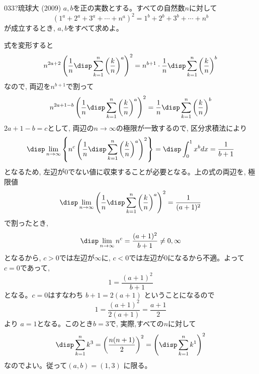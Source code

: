 \begin{prob}{033}{\hosi ?}{琉球大 (2009)}
 $a,b$を正の実数とする。すべての自然数$n$に対して
\[(1^a+2^a+3^a+\cdots +n^a)^2=1^b+2^b+3^b+\cdots +n^b\]
が成立するとき, $a,b$をすべて求めよ。
\end{prob}
式を変形すると
\[n^{2a+2}\left(\dfrac{1}{n}\disp\sum_{k=1}^{n}\left(\dfrac{k}{n}\right)^a\right)^2=n^{b+1}\cdot\dfrac{1}{n}\disp\sum_{k=1}^n\left(\dfrac{k}{n}\right)^b\]
なので, 両辺を$n^{b+1}$で割って
\[ n^{2a+1-b}\left(\dfrac{1}{n}\disp\sum_{k=1}^{n}\left(\dfrac{k}{n}\right)^a\right)^2=\dfrac{1}{n}\disp\sum_{k=1}^n\left(\dfrac{k}{n}\right)^b\]
$2a+1-b=c$として, 両辺の$n\to \infty$の極限が一致するので, 区分求積法により
\[\disp\lim_{n\to \infty} \left\{n^c\left(\dfrac{1}{n}\disp\sum_{k=1}^{n}\left(\dfrac{k}{n}\right)^a\right)^2\right\}=\disp\int_0^1 x^b dx = \dfrac{1}{b+1}\]
となるため, 左辺が0でない値に収束することが必要となる。上の式の両辺を, 極限値
\[\disp\lim_{n\to \infty} \left(\dfrac{1}{n}\disp\sum_{k=1}^n\left(\dfrac{k}{n}\right)^a\right)^{2} = \dfrac{1}{(a+1)^2}\]
で割ったとき,
\[\disp\lim_{n\to \infty} n^c = \dfrac{(a+1)^2}{b+1}\neq 0, \infty\]
となるから, $c>0$では左辺が$\infty$に, $c<0$では左辺が$0$になるから不適。よって$c=0$であって,
\[1=\dfrac{(a+1)^2}{b+1}\]
となる。$c=0$はすなわち $b+1=2(a+1)$ ということになるので
\[1=\dfrac{(a+1)^2}{2(a+1)}=\dfrac{a+1}{2}\]
より $a=1$となる。このとき$b=3$で, 実際,すべての$n$に対して
\[\disp\sum_{k=1}^n k^3=\left(\dfrac{n(n+1)}{2}\right)^2=\left(\disp\sum_{k=1}^n k^1\right)^2\]
なのでよい。従って$(a,b)=(1,3)$ に限る。